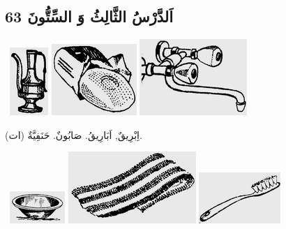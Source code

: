 \documentclass[a5paper]{article}
\begin{document}
\subsection{اَلدَّرْسُ الثَّالِثُ وَ السِّتُّونَ 63}
\  \includegraphics[width=0.5728in,height=1.0102in]{images/MuhammadBagauddinprettified-img204.png}   \includegraphics[width=1.2709in,height=1.0626in]{images/MuhammadBagauddinprettified-img205.png}   \includegraphics[width=1.6043in,height=1.1354in]{images/MuhammadBagauddinprettified-img206.png} 

اِبْرِيقٌ, اَبَارِيقُ. صَابُونٌ. حَنَفِيَّةٌ (ات). 

\  \includegraphics[width=0.8228in,height=0.4791in]{images/MuhammadBagauddinprettified-img207.png}   \includegraphics[width=1.9063in,height=1.0728in]{images/MuhammadBagauddinprettified-img208.png}   \includegraphics[width=1.2189in,height=0.7602in]{images/MuhammadBagauddinprettified-img209.png} 
\end{document}
